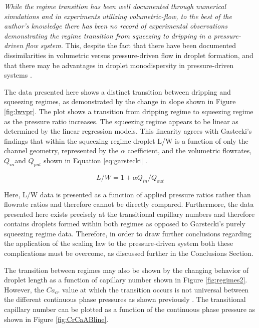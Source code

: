 \emph{While the regime transition has been well documented through numerical simulations and in experiments utilizing volumetric-flow, to the best of the author's knowledge there has been no record of experimental observations demonstrating the regime transition from squeezing to dripping in a pressure-driven flow system.} This, despite the fact that there have been documented dissimilarities in volumetric versus pressure-driven flow in droplet formation\cite{Ward2005}, and that there may be advantages in droplet monodispersity in pressure-driven systems \cite{Christopher200,Li2014a}.

The data presented here shows a distinct transition between dripping and squeezing regimes, as demonstrated by the change in slope shown in Figure \vref{fig:lwvpr}. The plot shows a transition from dripping regime to squeezing regime as the pressure ratio increases. The squeezing regime appears to be linear as determined by the linear regression models. This linearity agrees with Gastecki's findings that within the squeezing regime droplet L/W is a function of only the channel geometry, represented by the $\alpha$ coefficient, and the  volumetric flowrates, $Q_{in} $and $ Q_{put}$ shown in Equation \vref{eq:garstecki} \cite{Garstecki2006}.

\begin{equation}
L/W = 1 + \alpha Q_{in} / Q_{out}
\label{eq:garstecki}
\end{equation}

Here, L/W data is presented as a function of applied pressure ratios rather than flowrate ratios and therefore cannot be directly compared. Furthermore, the data presented here exists precisely at the transitional capillary numbers and therefore contains droplets formed within both regimes as opposed to Garstecki's purely squeezing regime data. Therefore, in order to draw further conclusions regarding the application of the scaling law to the pressure-driven system both these complications must be overcome, as discussed further in the Conclusions Section.

The transition between regimes may also be shown by the changing behavior of droplet length as a function of capillary number shown in Figure \vref{fig:regimes2}. However, the $Ca_{cr}$ value at which the transition occurs is not universal between the different continuous phase pressures as shown previously \cite{DeMenech2008}. The transitional capillary number can be plotted as a function of the continuous phase pressure as shown in Figure \vref{fig:CrCaABline}.

